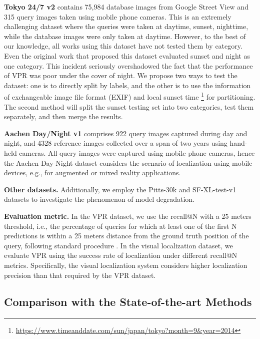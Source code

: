 \documentclass[10pt,twocolumn,letterpaper]{article}
\begin{document}
\noindent \textbf{Tokyo 24/7 v2} \cite{247_dataset} contains 75,984 database images from Google Street View and 315 query images taken using mobile phone cameras. This is an extremely challenging dataset where the queries were taken at daytime, sunset, nighttime, while the database images were only taken at daytime. However, to the best of our knowledge, all works using this dataset have not tested them by category. Even the original work that proposed this dataset evaluated sunset and night as one category. This incident seriously overshadowed the fact that the performance of VPR was poor under the cover of night. We propose two ways to test the dataset: one is to directly split by labels, and the other is to use the information of exchangeable image file format (EXIF) and local sunset time \footnote{\href{https://www.timeanddate.com/sun/japan/tokyo?month=9&year=2014}{https://www.timeanddate.com/sun/japan/tokyo?month=9\&year=2014}} for partitioning. The second method will split the sunset testing set into two categories, test them separately, and then merge the results.

\noindent \textbf{Aachen Day/Night v1} \cite{vl_benchmarking} comprises 922 query images captured during day and night, and 4328 reference images collected over a span of two years using hand-held cameras. All query images were captured using mobile phone cameras, hence the Aachen Day-Night dataset considers the scenario of localization using mobile devices, e.g., for augmented or mixed reality applications.

\noindent \textbf{Other datasets.} Additionally, we employ the Pitts-30k and SF-XL-test-v1 datasets to investigate the phenomenon of model degradation.

\noindent \textbf{Evaluation metric.} In the VPR dataset, we use the recall@N with a 25 meters threshold, i.e., the percentage of queries for which at least one of the first N predictions is within a 25 meters distance from the ground truth position of the query, following standard procedure \cite{netvlad, 247_dataset, appsvr, cosplace, sare, sfrs}. In the visual localization dataset, we evaluate VPR using the success rate of localization under different recall@N metrics. Specifically, the visual localization system considers higher localization precision than that required by the VPR dataset.



\subsection{Comparison with the State-of-the-art Methods}
\end{document}

